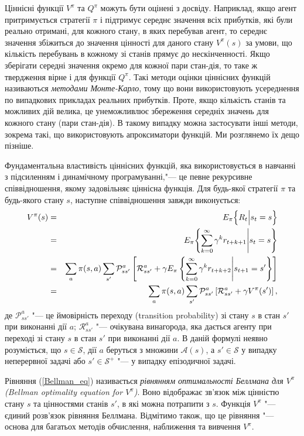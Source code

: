 Ціннісні функції $V^\pi$ та $Q^\pi$ можуть бути оцінені з досвіду. Наприклад, якщо агент притримується стратегії $\pi$ і підтримує середнє значення всіх прибутків, які були реально отримані, для кожного стану, в яких перебував агент, то середнє значення збіжиться до значення цінності для даного стану $V^\pi(s)$ за умови, що кількість перебувань в кожному зі станів прямує до нескінченності. Якщо зберігати середні значення окремо для кожної пари стан-дія, то таке ж твердження вірне і для функції $Q^\pi$. Такі методи оцінки ціннісних функцій називаються \emph{методами Монте-Карло}, тому що вони використовують усереднення по випадкових прикладах реальних прибутків. Проте, якщо кількість станів та можливих дій велика, це унеможливлює збереження середніх значень для кожного стану (пари стан-дія). В такому випадку можна застосувати інші методи, зокрема такі, що використовують апроксиматори функцій. Ми розглянемо їх дещо пізніше.

Фундаментальна властивість ціннісних функцій, яка використовується в навчанні з підсиленням і динамічному програмуванні,"--- це певне рекурсивне співвідношення, якому задовільняє ціннісна функція. Для будь-якої стратегії $\pi$ та будь-якого стану $s$, наступне співвідношення завжди виконується:
\begin{eqnarray}
V^\pi(s) & = & E_\pi \Bigl\{R_t \Big| s_t = s \Bigr\} \nonumber\\
			& = & E_\pi \Biggl\{\sum_{k=0}^{\infty}\gamma^k r_{t+k+1} \Bigg| s_t = s \Biggr\} \nonumber\\
			& = & \sum_a \pi(s,a)\sum_{s'}\mathcal{P}^a_{ss'} \left[ \mathcal{R}^a_{ss'}+\gamma E_\pi \left\{\sum_{k=0}^{\infty}\gamma^k r_{t+k+2} \Bigg| s_{t+1} = s' \right\} \right] \nonumber\\
			& = & \sum_a \pi(s,a)\sum_{s'}\mathcal{P}^a_{ss'} \left[ \mathcal{R}^a_{ss'}+\gamma V^\pi(s') \right],
\label{Bellman_eq}
\end{eqnarray}
де $\mathcal{P}^a_{ss'}$ "--- це ймовірність переходу (transition probability) зі стану $s$ в стан $s'$ при виконанні дії $a$; $\mathcal{R}^a_{ss'}$ "--- очікувана винагорода, яка дається агенту при переході зі стану $s$ в стан $s'$ при виконанні дії $a$. В даній формулі неявно розуміється, що $s \in \mathcal{S}$, дії $a$ беруться з множини $\mathcal{A}(s)$, а $s' \in \mathcal{S}$ у випадку неперервної задачі або $s' \in \mathcal{S^+}$ "--- у випадку епізодичної задачі.

Рівняння (\ref{Bellman_eq}) називається \emph{рівнянням оптимальності Беллмана для $V^\pi$ (Bellman optimality equation for $V^\pi$)}. Воно відображає зв'язок між цінністю стану $s$ та цінностями станів $s'$, в які можна потрапити з $s$. Функція $V^\pi$ "--- єдиний розв'язок рівняння Беллмана. Відмітимо також, що це рівняння "--- основа для багатьох методів обчислення, наближення та вивчення $V^\pi$.

